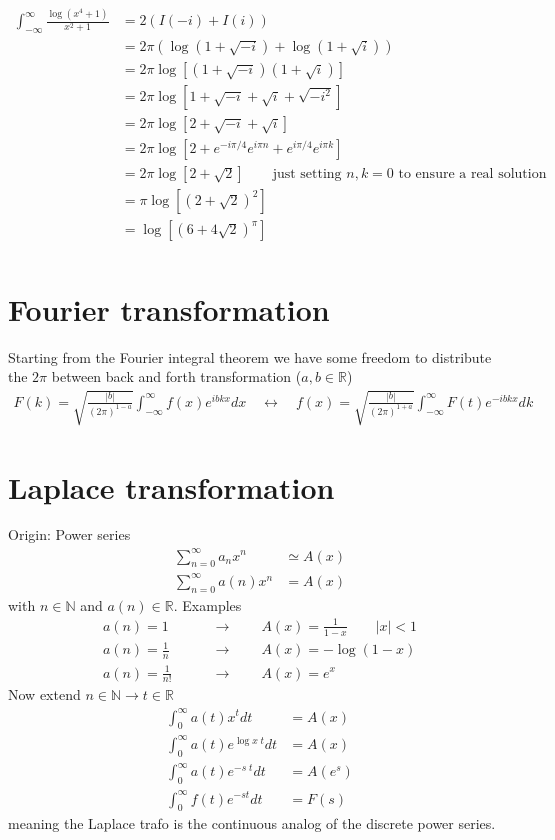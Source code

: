 \documentclass[10pt,a4paper]{book}
\theoremstyle{definition}
\begin{document}
\begin{align}
\int_{-\infty}^{\infty}\frac{\log(x^4+1)}{x^2+1}
&=2\left(I(-i)+I(i)\right)\\
&=2\pi\left(\log(1+\sqrt{-i})+\log(1+\sqrt{i})\right)\\
&=2\pi\log[(1+\sqrt{-i})(1+\sqrt{i})]\\
&=2\pi\log[1+\sqrt{-i}+\sqrt{i}+\sqrt{-i^2}]\\
&=2\pi\log[2+\sqrt{-i}+\sqrt{i}]\\
&=2\pi\log[2+e^{-i\pi/4}e^{i\pi n}+e^{i\pi/4}e^{i\pi k}]\\
&=2\pi\log[2+\sqrt{2}]\qquad\text{just setting $n,k=0$ to ensure a real solution}\\
&=\pi\log[(2+\sqrt{2})^2]\\
&=\log[(6+4\sqrt{2})^\pi]\\
\end{align}


\section{Fourier transformation}
Starting from the Fourier integral theorem we have some freedom to distribute the $2\pi$ between back and forth transformation ($a,b\in\mathbb{R}$)
\begin{align}
    F(k)=\sqrt{\frac{|b|}{(2\pi)^{1-a}}}\int_{-\infty}^\infty f(x)e^{ibkx}dx\quad\leftrightarrow\quad f(x)=\sqrt{\frac{|b|}{(2\pi)^{1+a}}}\int_{-\infty}^\infty F(t)e^{-ibkx}dk
\end{align}

\section{Laplace transformation}
Origin: Power series
\begin{align}
\sum_{n=0}^\infty a_n x^n&\simeq A(x)\\
\sum_{n=0}^\infty a(n) x^n&= A(x)
\end{align}
with $n\in\mathbb{N}$ and $a(n)\in\mathbb{R}$. Examples
\begin{align}
a(n)=1\qquad&\rightarrow\qquad A(x)=\frac{1}{1-x}\qquad|x|<1\\
a(n)=\frac{1}{n}\qquad&\rightarrow\qquad A(x)=-\log(1-x)\\
a(n)=\frac{1}{n!}\qquad&\rightarrow\qquad A(x)=e^x
\end{align}
Now extend $n\in\mathbb{N}\rightarrow t\in\mathbb{R}$
\begin{align}
\int_0^\infty a(t) x^t dt&=A(x)\\
\int_0^\infty a(t) e^{\log x\;t} dt&=A(x)\\
\int_0^\infty a(t) e^{-s\;t} dt&=A(e^{s})\\
\int_0^\infty f(t) e^{-st} dt&=F(s)
\end{align}
meaning the Laplace trafo is the continuous analog of the discrete power series.
\end{document}
